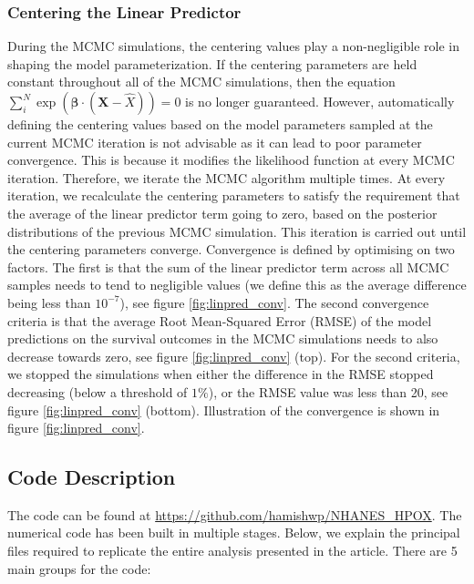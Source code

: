 \documentclass[
]{article}
\begin{document}
\hypertarget{centering-the-linear-predictor}{%
\subsubsection{Centering the Linear Predictor}\label{centering-the-linear-predictor}}

During the MCMC simulations, the centering values play a non-negligible role in shaping the model parameterization. If the centering parameters are held constant throughout all of the MCMC simulations, then the equation \(\sum_i^N \exp{(\boldsymbol{\beta}\cdot(\boldsymbol{X}-\hat{X}))}=0\) is no longer guaranteed. However, automatically defining the centering values based on the model parameters sampled at the current MCMC iteration is not advisable as it can lead to poor parameter convergence. This is because it modifies the likelihood function at every MCMC iteration. Therefore, we iterate the MCMC algorithm multiple times. At every iteration, we recalculate the centering parameters to satisfy the requirement that the average of the linear predictor term going to zero, based on the posterior distributions of the previous MCMC simulation. This iteration is carried out until the centering parameters converge. Convergence is defined by optimising on two factors. The first is that the sum of the linear predictor term across all MCMC samples needs to tend to negligible values (we define this as the average difference being less than \(10^{-7}\)), see figure \ref{fig:linpred_conv}. The second convergence criteria is that the average Root Mean-Squared Error (RMSE) of the model predictions on the survival outcomes in the MCMC simulations needs to also decrease towards zero, see figure \ref{fig:linpred_conv} (top). For the second criteria, we stopped the simulations when either the difference in the RMSE stopped decreasing (below a threshold of \(1\%\)), or the RMSE value was less than 20, see figure \ref{fig:linpred_conv} (bottom). Illustration of the convergence is shown in figure \ref{fig:linpred_conv}.

\hypertarget{code-description}{%
\subsection{Code Description}\label{code-description}}

The code can be found at \url{https://github.com/hamishwp/NHANES_HPOX}. The numerical code has been built in multiple stages. Below, we explain the principal files required to replicate the entire analysis presented in the article. There are 5 main groups for the code:
\end{document}
